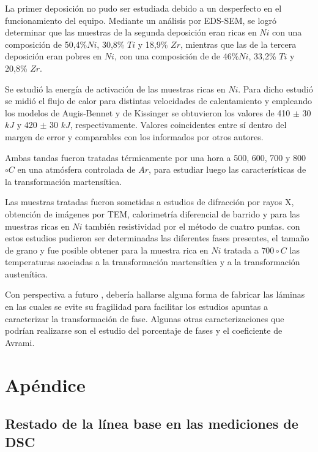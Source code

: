 \documentclass[12pt]{article}
\theoremstyle{definition}
\theoremstyle{remark}
\begin{document}
{La primer deposición no pudo ser estudiada debido a un desperfecto en el funcionamiento del equipo. Mediante un análisis por EDS-SEM, se logró determinar que las muestras de la segunda deposición eran ricas en $Ni$ con una composición de 50,4\%$Ni$, 30,8\% $Ti$ y 18,9\% $Zr$, mientras que las de la tercera deposición eran pobres en $Ni$, con una composición de de 46\%$Ni$, 33,2\% $Ti$ y 20,8\% $Zr$.

Se estudió la energía de activación de las muestras ricas en $Ni$. Para dicho estudió se midió el flujo de calor para distintas velocidades de calentamiento y empleando los modelos de Augis-Bennet y de Kissinger se obtuvieron los valores de 410 $\pm$ 30 $kJ$ y 420 $\pm$ 30 $kJ$, respectivamente. Valores coincidentes entre sí dentro del margen de error y comparables con los informados por otros autores.

Ambas tandas fueron tratadas térmicamente por una hora a 500, 600, 700 y 800$\circ C$ en una atmósfera controlada de $Ar$, para estudiar luego las características de la transformación martensítica.

Las muestras tratadas fueron sometidas a estudios de difracción por rayos X, obtención de imágenes por TEM, calorimetría diferencial de barrido y para las muestras ricas en $Ni$ también resistividad por el método de cuatro puntas. con estos estudios pudieron ser determinadas las diferentes fases presentes, el tamaño de grano y fue posible obtener para la muestra rica en $Ni$ tratada a $700\circ C$ las temperaturas asociadas a la transformación martensítica y a la transformación austenítica.

Con perspectiva a futuro , debería hallarse alguna forma de fabricar las láminas en las cuales se evite su fragilidad para facilitar los estudios apuntas a caracterizar la transformación de fase. Algunas otras caracterizaciones que podrían realizarse son el estudio del porcentaje de fases y el coeficiente de Avrami.


\nocite{*} 



\newpage
\appendix
\section{Apéndice}
\label{Appendix}
\subsection{Restado de la línea base en las mediciones de DSC}
\label{BaseLineAppendix}

}
\end{document}
